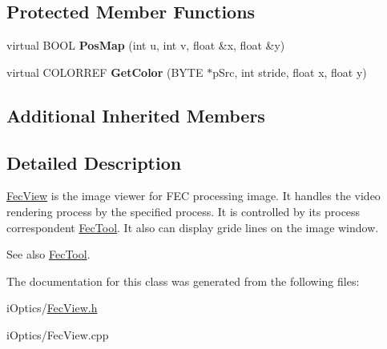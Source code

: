 \subsection*{Protected Member Functions}
\begin{DoxyCompactItemize}
\item 
\mbox{\label{class_fec_view_a10a85bda7c6440797e16ecf9aba87233}} 
virtual B\+O\+OL {\bfseries Pos\+Map} (int u, int v, float \&x, float \&y)
\item 
\mbox{\label{class_fec_view_a15de2adcdfb141d22ff96cb6d5fdb607}} 
virtual C\+O\+L\+O\+R\+R\+EF {\bfseries Get\+Color} (B\+Y\+TE $\ast$p\+Src, int stride, float x, float y)
\end{DoxyCompactItemize}
\subsection*{Additional Inherited Members}


\subsection{Detailed Description}
\mbox{\hyperlink{class_fec_view}{Fec\+View}} is the image viewer for F\+EC processing image. It handles the video rendering process by the specified process. It is controlled by its process correspondent \mbox{\hyperlink{class_fec_tool}{Fec\+Tool}}. It also can display gride lines on the image window. 

\begin{DoxySeeAlso}{See also}
\mbox{\hyperlink{class_fec_tool}{Fec\+Tool}}. 
\end{DoxySeeAlso}


The documentation for this class was generated from the following files\+:\begin{DoxyCompactItemize}
\item 
i\+Optics/\mbox{\hyperlink{_fec_view_8h}{Fec\+View.\+h}}\item 
i\+Optics/Fec\+View.\+cpp\end{DoxyCompactItemize}
